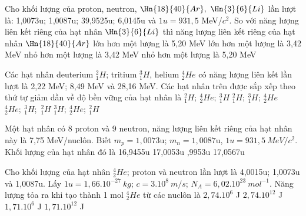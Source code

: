 \begin{vidu}%
 Cho khối lượng của proton, neutron, $\Hn{18}{40}{Ar},\ \Hn{3}{6}{Li}$ lần lượt là: 1,0073u; 1,0087u; 39,9525u; 6,0145u và $1u = 931,5$ MeV/$c^2$. So với năng lượng liên kết riêng của hạt nhân $\Hn{3}{6}{Li}$ thì năng lượng liên kết riêng của hạt nhân $\Hn{18}{40}{Ar}$
\choice
{lớn hơn một lượng là 5,20 MeV}
{\True lớn hơn một lượng là 3,42 MeV}
{nhỏ hơn một lượng là 3,42 MeV}
{nhỏ hơn một lượng là 5,20 MeV}
\end{vidu}
\begin{vidu}%
 Các hạt nhân deuterium $_1^2H$; tritium $_1^3H$, helium $_2^4He$ có năng lượng liên kết lần lượt là 2,22 MeV; 8,49 MeV và 28,16 MeV. Các hạt nhân trên được sắp xếp theo thứ tự giảm dần về độ bền vững của hạt nhân là
\choice
{$_1^2H;\ _2^4He;\ _1^3H$}
{$_1^2H;\ _1^3H;\ _2^4He$}
{\True $_2^4He;\ _1^3H$;\ $_1^2H$}
{$_1^3H;\ _2^4He;\ _1^2H$}
\end{vidu}
\begin{vidu}%
Một hạt nhân có 8 proton và 9 neutron, năng lượng liên kết riêng của hạt nhân này là 7,75 MeV/nuclôn. Biết $m_p = 1,0073$u; $m_n = 1,0087$u, $1u=931,5\ MeV/c^2$. Khối lượng của hạt nhân đó là
\choice
{16,9455u}
{17,0053u}
{,9953u}
{17,0567u}
\end{vidu}
\begin{vidu}%
 Cho khối lượng của hạt nhân $_2^4He$; proton và neutron lần lượt là 4,0015u; 1,0073u và 1,0087u. Lấy $1u = 1,66.10^{-27}\ kg$; $c = 3.10^8\ m/s$; $N_A = 6,02.10^{23}\ mol^{-1}$. Năng lượng tỏa ra khi tạo thành 1 mol $_2^4He$ từ các nuclôn là
\choice
{$2,74.10^6$ J}
{\True $2,74.10^{12}$ J}
{$1,71.10^6$ J}
{$1,71.10^{12}$ J}
\end{vidu}
